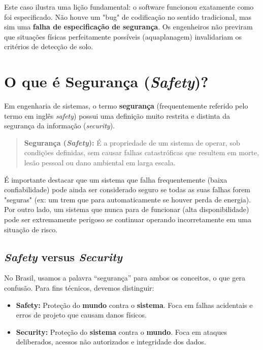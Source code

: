 \documentclass[12pt,a4paper]{report}
\begin{document}
Este caso ilustra uma lição fundamental: o software funcionou exatamente como foi especificado. Não houve um "bug" de codificação no sentido tradicional, mas sim uma \textbf{falha de especificação de segurança}. Os engenheiros não previram que situações físicas perfeitamente possíveis (aquaplanagem) invalidariam os critérios de detecção de solo.

\section{O que é Segurança (\textit{Safety})?}

Em engenharia de sistemas, o termo \textbf{segurança} (frequentemente referido pelo termo em inglês \emph{safety}) possui uma definição muito restrita e distinta da segurança da informação (\emph{security}).

\begin{quote}
    \textbf{Segurança (\textit{Safety}):} É a propriedade de um sistema de operar, sob condições definidas, sem causar falhas catastróficas que resultem em morte, lesão pessoal ou dano ambiental em larga escala.
\end{quote}

É importante destacar que um sistema que falha frequentemente (baixa confiabilidade) pode ainda ser considerado seguro se todas as suas falhas forem "seguras" (ex: um trem que para automaticamente se houver perda de energia). Por outro lado, um sistema que nunca para de funcionar (alta disponibilidade) pode ser extremamente perigoso se continuar operando incorretamente em uma situação de risco.

\subsection{\textit{Safety} versus \textit{Security}}

No Brasil, usamos a palavra ``segurança'' para ambos os conceitos, o que gera confusão. Para fins técnicos, devemos distinguir:
\begin{itemize}
    \item \textbf{Safety:} Proteção do \textbf{mundo} contra o \textbf{sistema}. Foca em falhas acidentais e erros de projeto que causam danos físicos.
    \item \textbf{Security:} Proteção do \textbf{sistema} contra o \textbf{mundo}. Foca em ataques deliberados, acessos não autorizados e integridade dos dados.
\end{itemize}
\end{document}
